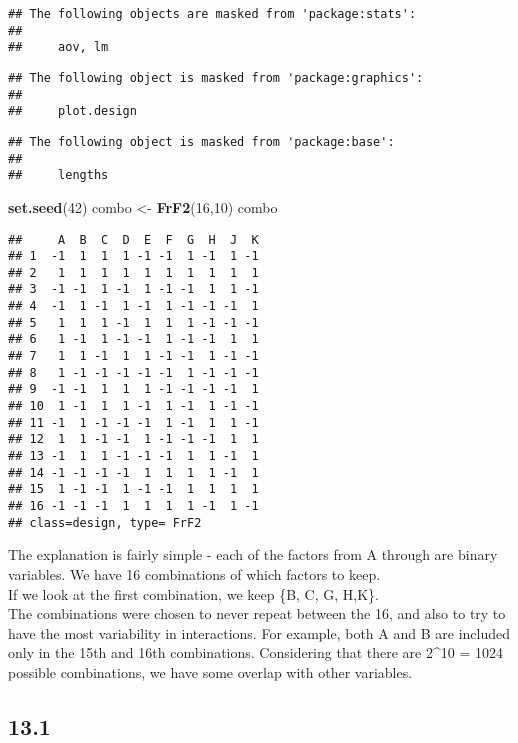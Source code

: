 \documentclass[]{article}
\newenvironment{Shaded}{\begin{snugshade}}{\end{snugshade}}
\newcommand{\KeywordTok}[1]{\textcolor[rgb]{0.13,0.29,0.53}{\textbf{#1}}}
\newcommand{\DecValTok}[1]{\textcolor[rgb]{0.00,0.00,0.81}{#1}}
\newcommand{\StringTok}[1]{\textcolor[rgb]{0.31,0.60,0.02}{#1}}
\newcommand{\NormalTok}[1]{#1}
\begin{document}
\begin{verbatim}
## The following objects are masked from 'package:stats':
## 
##     aov, lm
\end{verbatim}

\begin{verbatim}
## The following object is masked from 'package:graphics':
## 
##     plot.design
\end{verbatim}

\begin{verbatim}
## The following object is masked from 'package:base':
## 
##     lengths
\end{verbatim}

\begin{Shaded}
\begin{Highlighting}[]
\KeywordTok{set.seed}\NormalTok{(}\DecValTok{42}\NormalTok{)}
\NormalTok{combo <-}\StringTok{ }\KeywordTok{FrF2}\NormalTok{(}\DecValTok{16}\NormalTok{,}\DecValTok{10}\NormalTok{)}
\NormalTok{combo}
\end{Highlighting}
\end{Shaded}

\begin{verbatim}
##     A  B  C  D  E  F  G  H  J  K
## 1  -1  1  1  1 -1 -1  1 -1  1 -1
## 2   1  1  1  1  1  1  1  1  1  1
## 3  -1 -1  1 -1  1 -1 -1  1  1 -1
## 4  -1  1 -1  1 -1  1 -1 -1 -1  1
## 5   1  1  1 -1  1  1  1 -1 -1 -1
## 6   1 -1  1 -1 -1  1 -1 -1  1  1
## 7   1  1 -1  1  1 -1 -1  1 -1 -1
## 8   1 -1 -1 -1 -1 -1  1 -1 -1 -1
## 9  -1 -1  1  1  1 -1 -1 -1 -1  1
## 10  1 -1  1  1 -1  1 -1  1 -1 -1
## 11 -1  1 -1 -1 -1  1 -1  1  1 -1
## 12  1  1 -1 -1  1 -1 -1 -1  1  1
## 13 -1  1  1 -1 -1 -1  1  1 -1  1
## 14 -1 -1 -1 -1  1  1  1  1 -1  1
## 15  1 -1 -1  1 -1 -1  1  1  1  1
## 16 -1 -1 -1  1  1  1  1 -1  1 -1
## class=design, type= FrF2
\end{verbatim}

The explanation is fairly simple - each of the factors from A through
are binary variables. We have 16 combinations of which factors to
keep.\\
If we look at the first combination, we keep \{B, C, G, H,K\}.\\
The combinations were chosen to never repeat between the 16, and also to
try to have the most variability in interactions. For example, both A
and B are included only in the 15th and 16th combinations. Considering
that there are 2\^{}10 = 1024 possible combinations, we have some
overlap with other variables.

\subsection{13.1}\label{section-2}
\end{document}
